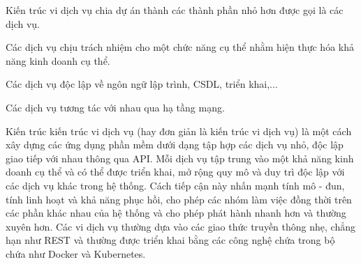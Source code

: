 Kiến trúc vi dịch vụ chia dự án thành các thành phần nhỏ hơn được gọi là các dịch vụ.

Các dịch vụ chịu trách nhiệm cho một chức năng cụ thể nhằm hiện thực hóa khả năng kinh doanh cụ thể.

Các dịch vụ độc lập về ngôn ngữ lập trình, CSDL, triển khai,...

Các dịch vụ tương tác với nhau qua hạ tầng mạng.












Kiến trúc kiến trúc vi dịch vụ (hay đơn giản là kiến trúc vi dịch vụ) là một cách xây dựng các ứng dụng phần mềm dưới dạng tập hợp các dịch vụ nhỏ, độc lập giao tiếp với nhau thông qua API. Mỗi dịch vụ tập trung vào một khả năng kinh doanh cụ thể và có thể được triển khai, mở rộng quy mô và duy trì độc lập với các dịch vụ khác trong hệ thống. Cách tiếp cận này nhấn mạnh tính mô - đun, tính linh hoạt và khả năng phục hồi, cho phép các nhóm làm việc đồng thời trên các phần khác nhau của hệ thống và cho phép phát hành nhanh hơn và thường xuyên hơn. Các vi dịch vụ thường dựa vào các giao thức truyền thông nhẹ, chẳng hạn như REST và thường được triển khai bằng các công nghệ chứa trong bộ chứa như Docker và Kubernetes.
